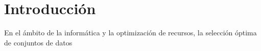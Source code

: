 \chapter{Introducción}

En el ámbito de la informática y la optimización de recursos, la selección óptima de conjuntos de datos